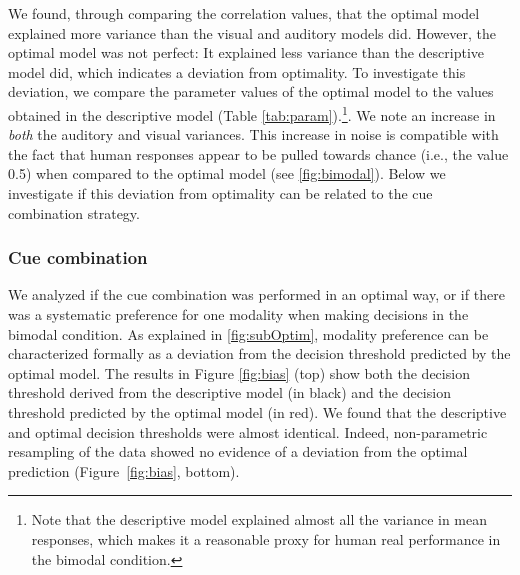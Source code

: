 \documentclass[english,,man,floatsintext]{apa6}
\let\rmarkdownfootnote\footnote%
\def\footnote{\protect\rmarkdownfootnote}
\theoremstyle{definition}
\theoremstyle{definition}
\theoremstyle{definition}
\theoremstyle{remark}
\begin{document}
We found, through comparing the correlation values, that the optimal
model explained more variance than the visual and auditory models did.
However, the optimal model was not perfect: It explained less variance
than the descriptive model did, which indicates a deviation from
optimality. To investigate this deviation, we compare the parameter
values of the optimal model to the values obtained in the descriptive
model (Table
\ref{tab:param}).\footnote{Note that the descriptive model explained almost all the variance in mean responses, which makes it a reasonable proxy for human real performance in the bimodal condition.}.
We note an increase in \emph{both} the auditory and visual variances.
This increase in noise is compatible with the fact that human responses
appear to be pulled towards chance (i.e., the value 0.5) when compared
to the optimal model (see \ref{fig:bimodal}). Below we investigate if
this deviation from optimality can be related to the cue combination
strategy.

\subsubsection{Cue combination}\label{cue-combination}

We analyzed if the cue combination was performed in an optimal way, or
if there was a systematic preference for one modality when making
decisions in the bimodal condition. As explained in \ref{fig:subOptim},
modality preference can be characterized formally as a deviation from
the decision threshold predicted by the optimal model. The results in
Figure \ref{fig:bias} (top) show both the decision threshold derived
from the descriptive model (in black) and the decision threshold
predicted by the optimal model (in red). We found that the descriptive
and optimal decision thresholds were almost identical. Indeed,
non-parametric resampling of the data showed no evidence of a deviation
from the optimal prediction (Figure~\ref{fig:bias}, bottom).
\end{document}
